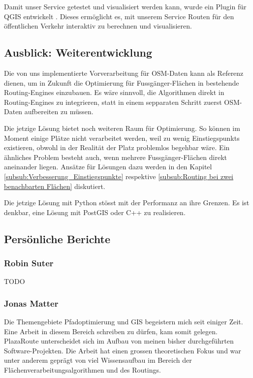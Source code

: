 Damit unser Service getestet und visualisiert werden kann, wurde ein Plugin für QGIS entwickelt \cite{github:PlazaRoute-qgis-plugin}. Dieses ermöglicht es, mit unserem Service Routen für den öffentlichen Verkehr interaktiv zu berechnen und visualisieren.

\subsection{Ausblick: Weiterentwicklung}
\label{sub:Ausblick: Weiterentwicklung}

Die von uns implementierte Vorverarbeitung für \ac{OSM}-Daten kann als Referenz dienen, um in Zukunft die Optimierung für Fussgänger-Flächen in bestehende Routing-Engines einzubauen. Es wäre sinnvoll, die Algorithmen direkt in Routing-Engines zu integrieren, statt in einem sepparaten Schritt zuerst \ac{OSM}-Daten aufbereiten zu müssen.

Die jetzige Lösung bietet noch weiteren Raum für Optimierung. So können im Moment einige Plätze nicht verarbeitet werden, weil zu wenig \glspl{Einstiegspunkt} existieren, obwohl in der Realität der Platz problemlos begehbar wäre. Ein ähnliches Problem besteht auch, wenn mehrere Fussgänger-Flächen direkt aneinander liegen. Ansätze für Lösungen dazu werden in den Kapitel \ref{subsub:Verbesserung_Einstiegspunkte} respektive \ref{subsub:Routing bei zwei benachbarten Flächen} diskutiert.

Die jetzige Lösung mit Python stösst mit der Performanz an ihre Grenzen. Es ist denkbar, eine Lösung mit PostGIS oder C++ zu realisieren.

\subsection{Persönliche Berichte}
\label{sub:Persönliche Berichte}

\subsubsection{Robin Suter}
\label{Persönliche Berichte:Robin Suter}
TODO

\subsubsection{Jonas Matter}
\label{Persönliche Berichte:Jonas Matter}
Die Themengebiete Pfadoptimierung und GIS begeistern mich seit einiger Zeit. Eine Arbeit in diesem Bereich schreiben zu dürfen, kam somit gelegen. PlazaRoute unterscheidet sich im Aufbau von meinen bisher durchgeführten Software-Projekten. Die Arbeit hat einen grossen theoretischen Fokus und war unter anderem geprägt von viel Wissensaufbau im Bereich der Flächenverarbeitungsalgorithmen und des Routings. 

